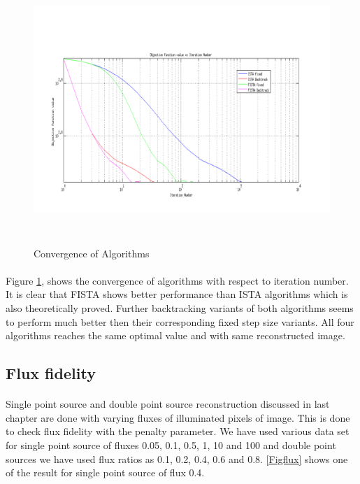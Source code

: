 \begin{figure}[!htbp]
  \begin{center}
      \includegraphics[width=6.1in,height=4in]{figures/convergence}
    \caption{Convergence of Algorithms}
    \label{Figconvergence}
  \end{center}
\end{figure}

\paragraph{}Figure \ref{Figconvergence}, shows the convergence of algorithms with 
respect to iteration number. It is clear that FISTA shows better performance 
than ISTA algorithms which is also theoretically proved. Further backtracking variants of both algorithms seems to 
perform much better then their corresponding fixed step size variants. All
four algorithms reaches the same optimal value and with same reconstructed image.

\newpage
\subsection{Flux fidelity}
\label{s:discussion_ff}

\paragraph{}Single point source and double point source reconstruction discussed in last chapter
are done with varying fluxes of illuminated pixels of image. This is done to check flux fidelity
with the penalty parameter. We have used various data set for single point source of fluxes 0.05, 0.1,
0.5, 1, 10 and 100 and double point sources we have used flux ratios as 0.1, 0.2, 0.4, 0.6 and 0.8.
\ref{Figflux} shows one of the result for single point source of flux 0.4.

